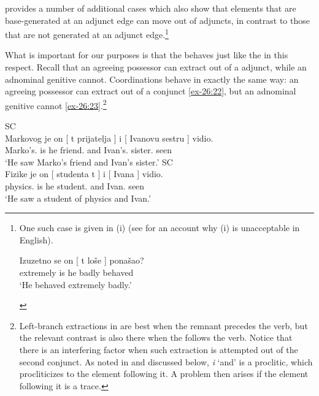 \documentclass[output=paper]{langsci/langscibook}
\begin{document}
\textcite{Boskovic2018} provides a number of additional cases which also
show that elements that are base-generated at an adjunct edge can move out of
adjuncts, in contrast to those that are not generated at an adjunct
edge.\footnote{One such case is given in (i) (see \citealt{Boskovic2018} for
    an account why (i) is unacceptable in English).

\begin{exe}
    \gll    Izuzetno se on [ t loše ] ponašao?\\
            extremely is he {} {} badly {} behaved\\
    \glt    \enquote*{He behaved extremely badly.}
\end{exe}}

What is important for our purposes is that the  behaves just like the
 in this respect. Recall that an agreeing possessor can extract out of
a  adjunct, while an adnominal genitive cannot. Coordinations behave
in exactly the same way: an agreeing possessor can extract out of a conjunct
\eqref{ex-26:22}, but an adnominal genitive cannot \eqref{ex-26:23}.\footnote{Left-branch extractions
    in  are best when the remnant precedes the verb, but the relevant
    contrast is also there when the  follows the verb. Notice that
    there is an interfering factor when such extraction is attempted out of the
    second conjunct. As noted in \textcite{Stjepanovic2014} and discussed below,
    \emph{i} ‘and’ is a proclitic, which procliticizes to the element following
it. A problem then arises if the element following it is a trace.}

\ea\label{ex-26:22}\glsdesc{SC}\\
	\gll    Markovog je on [ t prijatelja ] i [ Ivanovu sestru ] vidio.\\
            Marko’s.\Acc{} is he {} {} friend.\Acc{} {} and {} Ivan’s.\Acc{}
            sister.\Acc{} {} seen\\
	\glt    \enquote*{He saw Marko’s friend and Ivan’s sister.}
\ex\label{ex-26:23}\glsdesc{SC}\\
    \gll \llap{*}Fizike je on [ studenta t ] i [ Ivana ] vidio.\\
            physics.\Gen{} is he {} student.\Acc{} {} {} and {} Ivan.\Acc{} {} seen\\
    \glt    \enquote*{He saw a student of physics and Ivan.}%
\z
\end{document}
